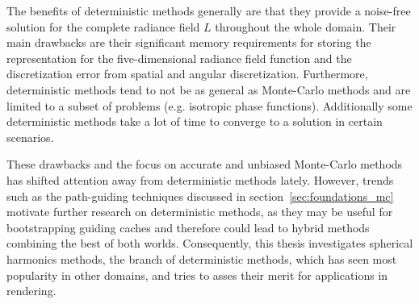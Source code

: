 The benefits of deterministic methods generally are that they provide a noise-free solution for the complete radiance field $L$ throughout the whole domain. Their main drawbacks are their significant memory requirements for storing the representation for the five-dimensional radiance field function and the discretization error from spatial and angular discretization. Furthermore, deterministic methods tend to not be as general as Monte-Carlo methods and are limited to a subset of problems (e.g. isotropic phase functions). Additionally some deterministic methods take a lot of time to converge to a solution in certain scenarios.

These drawbacks and the focus on accurate and unbiased Monte-Carlo methods has shifted attention away from deterministic methods lately. However, trends such as the path-guiding techniques discussed in section~\ref{sec:foundations_mc} motivate further research on deterministic methods, as they may be useful for bootstrapping guiding caches and therefore could lead to hybrid methods combining the best of both worlds. Consequently, this thesis investigates spherical harmonics methods, the branch of deterministic methods, which has seen most popularity in other domains, and tries to asses their merit for applications in rendering.

